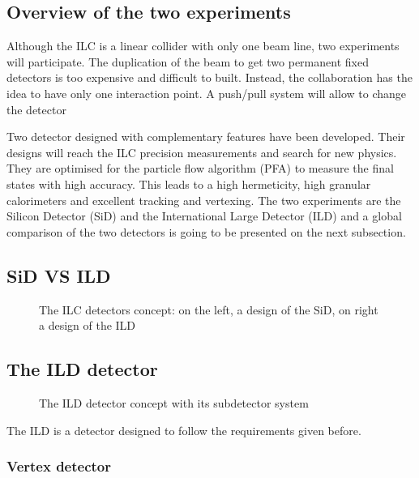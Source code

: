     \subsection{Overview of the two experiments}
    
  Although the ILC is a linear collider with only one beam line, two experiments will participate.
  The duplication of the beam to get two permanent fixed detectors is too expensive and difficult to built.
  Instead, the collaboration has the idea to have only one interaction point.
  A push/pull system will allow to change the detector 

  Two detector designed with complementary features have been developed. 
  Their designs will reach the ILC precision measurements and search for new physics. 
  They are optimised for the particle flow algorithm (PFA) to measure the final states with high accuracy.
  This leads to a high hermeticity, high granular calorimeters and excellent tracking and vertexing. 
  The two experiments are the Silicon Detector (SiD) and the International Large Detector (ILD) and a global comparison of the two detectors is going to be presented on the next subsection.

      \subsection{SiD VS ILD}
    \begin{figure}
      \centering
      \caption{The ILC detectors concept: on the left, a design of the SiD, on right a design of the ILD }
      \label{fig:SiLD}
    \end{figure}    
    
    \subsection{The ILD detector}

    \begin{figure}
      \centering
      \caption{The ILD detector concept with its subdetector system}
      \label{fig:ILD}
    \end{figure}

    The ILD is a detector designed to follow the requirements given before.
    

      \subsubsection{Vertex detector}

